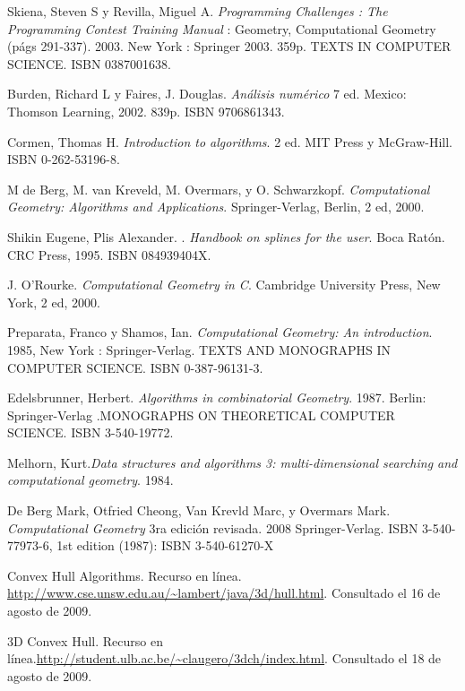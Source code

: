 \documentclass[final, 12pt letterpaper]{article}
\begin{document}
\clearpage
\begin{thebibliography}{20}
Skiena, Steven S y Revilla, Miguel A. \emph{Programming Challenges : The Programming Contest Training Manual} : Geometry, Computational Geometry (págs 291-337). 2003. New York : Springer 2003. 359p. TEXTS IN COMPUTER SCIENCE.  ISBN 0387001638.

Burden, Richard L y Faires, J. Douglas.\emph{ Análisis numérico} 7 ed. Mexico: Thomson Learning, 2002. 839p. ISBN 9706861343.

Cormen, Thomas H. \emph{Introduction to algorithms}. 2 ed. MIT Press y McGraw-Hill. ISBN 0-262-53196-8.

M de Berg, M. van Kreveld, M. Overmars, y O. Schwarzkopf. \emph{Computational
Geometry: Algorithms and Applications}. Springer-Verlag, Berlin, 2 ed, 2000.

Shikin Eugene, Plis Alexander.
. \emph{Handbook on splines for the user}. Boca Ratón. CRC Press, 1995. ISBN 084939404X. 

J. O’Rourke. \emph{Computational Geometry in C}. Cambridge University Press, New
York, 2 ed, 2000.

Preparata, Franco y Shamos, Ian. \emph{Computational Geometry: An introduction}. 1985, New York : Springer-Verlag. TEXTS AND MONOGRAPHS IN COMPUTER SCIENCE. ISBN 0-387-96131-3.

Edelsbrunner, Herbert. \emph{Algorithms in combinatorial Geometry}. 1987. Berlin: Springer-Verlag .MONOGRAPHS ON THEORETICAL COMPUTER SCIENCE. ISBN 3-540-19772.

Melhorn, Kurt.\emph{Data structures and algorithms 3: multi-dimensional searching and computational geometry}. 1984.

De Berg Mark, Otfried Cheong, Van Krevld Marc, y Overmars Mark. \emph{Computational Geometry} 3ra edición revisada. 2008 Springer-Verlag. ISBN 3-540-77973-6, 1st edition (1987): ISBN 3-540-61270-X

Convex Hull Algorithms. Recurso en línea. 
\newblock \url{http://www.cse.unsw.edu.au/~lambert/java/3d/hull.html}. Consultado el 16 de agosto de 2009.

3D Convex Hull. Recurso en línea.\newblock \url{http://student.ulb.ac.be/~claugero/3dch/index.html}. Consultado el 18 de agosto de 2009.


\end{thebibliography}
\end{document}
